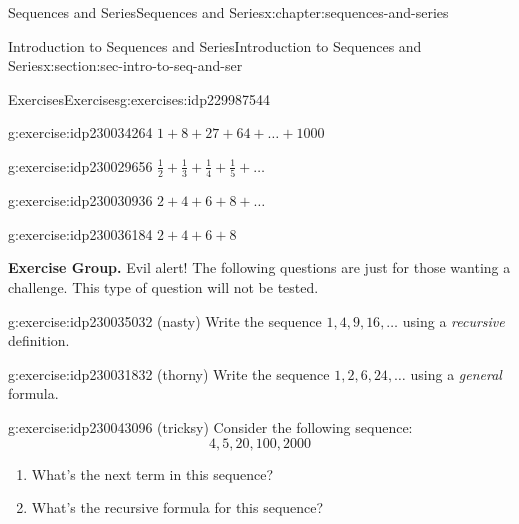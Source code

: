 \documentclass[twoside,10pt,]{book}
\numberwithin{equation}{section}
\begin{document}
\begin{chapterptx}{Sequences and Series}{}{Sequences and Series}{}{}{x:chapter:sequences-and-series}
\begin{sectionptx}{Introduction to Sequences and Series}{}{Introduction to Sequences and Series}{}{}{x:section:sec-intro-to-seq-and-ser}
\begin{exercises-subsection}{Exercises}{}{Exercises}{}{}{g:exercises:idp229987544}
\begin{exercisegroup}
\begin{divisionexerciseeg}{33}{}{}{g:exercise:idp230034264}%
\(1 + 8 + 27 + 64 + \ldots + 1000\)\end{divisionexerciseeg}%
\begin{divisionexerciseeg}{34}{}{}{g:exercise:idp230029656}%
\(\frac{1}{2} + \frac{1}{3} + \frac{1}{4} + \frac{1}{5} + \ldots\)\end{divisionexerciseeg}%
\begin{divisionexerciseeg}{35}{}{}{g:exercise:idp230030936}%
\(2 + 4 + 6 + 8 + \ldots\)\end{divisionexerciseeg}%
\begin{divisionexerciseeg}{36}{}{}{g:exercise:idp230036184}%
\(2 + 4 + 6 + 8\)\end{divisionexerciseeg}%
\end{exercisegroup}
\par\medskip\noindent
\par\medskip\noindent%
\textbf{Exercise Group.}\space\space%
Evil alert!  The following questions are just for those wanting a challenge.  This type of question will not be tested.\begin{exercisegroup}
\begin{divisionexerciseeg}{37}{}{}{g:exercise:idp230035032}%
(nasty)  Write the sequence \(1, 4, 9, 16, \ldots\) using a \emph{recursive} definition.\end{divisionexerciseeg}%
\begin{divisionexerciseeg}{38}{}{}{g:exercise:idp230031832}%
(thorny)  Write the sequence \(1, 2, 6, 24, \ldots\) using a \emph{general} formula.\end{divisionexerciseeg}%
\begin{divisionexerciseeg}{39}{}{}{g:exercise:idp230043096}%
(tricksy)  Consider the following sequence:%
\begin{equation*}
4, 5, 20, 100, 2000
\end{equation*}
%
\begin{enumerate}[label=(\alph*)]
\item{}What's the next term in this sequence?%
\item{}What's the recursive formula for this sequence?%
\end{enumerate}
\end{divisionexerciseeg}%
\end{exercisegroup}
\par\medskip\noindent
\end{exercises-subsection}
%
%
\typeout{************************************************}

\end{sectionptx}
\end{chapterptx}
\end{document}
